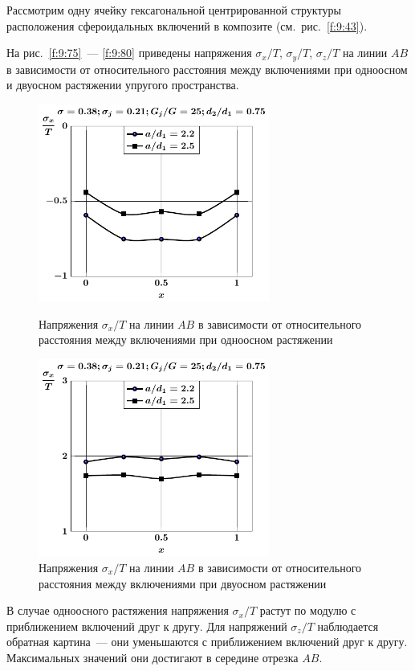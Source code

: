 Рассмотрим одну ячейку гексагональной центрированной структуры расположения сфероидальных включений в композите (см.~рис.~\ref{f:9:43}).

На рис.~\ref{f:9:75}~--- \ref{f:9:80} приведены напряжения $\sigma_x/T$, $\sigma_y/T$, $\sigma_z/T$ на линии $AB$ в зависимости от относительного расстояния между включениями при одноосном и двуосном растяжении упругого пространства.

\begin{figure}[h!]
\centering\footnotesize
\parbox[b]{7.5cm}{\centering\includegraphics[width=7.6cm]{inc13-a-d75-g25-t1-sig_x-ab.pdf}
\caption{Напряжения $\sigma_x/T$ на линии $AB$ в зависимости от относительного расстояния между включениями при одноосном растяжении
\label{f:9:75}}}\hfil\hfil
\parbox[b]{7.5cm}{\centering\includegraphics[width=7.6cm]{inc13-a-d75-g25-t2-sig_x-ab.pdf}
\caption{Напряжения $\sigma_x/T$ на линии $AB$ в зависимости от относительного расстояния между включениями при двуосном растяжении
\label{f:9:76}}}
\end{figure}

В случае одноосного растяжения напряжения $\sigma_x/T$ растут по модулю с приближением включений друг к другу. Для напряжений $\sigma_z/T$ наблюдается обратная картина~--- они уменьшаются с приближением включений друг к другу. Максимальных значений они достигают в середине отрезка $AB$.

